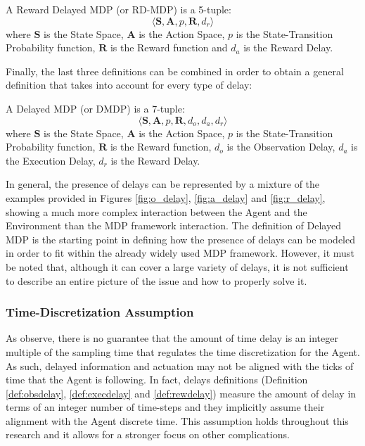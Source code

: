             \begin{definition}
                \label{def:rdmdp}
                A Reward Delayed MDP (or RD-MDP) is a 5-tuple:
                \[ \langle \mathbf{S}, \mathbf{A}, p, \mathbf{R}, d_r \rangle\]
                where $\mathbf{S}$ is the State Space, $\mathbf{A}$ is the Action Space, $p$ is the State-Transition Probability function, $\mathbf{R}$ is the Reward function and $d_a$ is the Reward Delay.
            \end{definition}
            \noindent
            Finally, the last three definitions can be combined in order to obtain a general definition that takes into account for every type of delay:
            
            \begin{definition}
                \label{def:dmdp}
                A Delayed MDP (or DMDP) is a 7-tuple:
                \[ \langle \mathbf{S}, \mathbf{A}, p, \mathbf{R}, d_o, d_a, d_r \rangle\]
                where $\mathbf{S}$ is the State Space, $\mathbf{A}$ is the Action Space, $p$ is the State-Transition Probability function, $\mathbf{R}$ is the Reward function, $d_o$ is the Observation Delay, $d_a$ is the Execution Delay, $d_r$ is the Reward Delay.
            \end{definition}
            \noindent
            In general, the presence of delays can be represented by a mixture of the examples provided in Figures \ref{fig:o_delay}, \ref{fig:a_delay} and \ref{fig:r_delay}, showing a much more complex interaction between the Agent and the Environment than the MDP framework interaction. \newline
            The definition of Delayed MDP is the starting point in defining how the presence of delays can be modeled in order to fit within the already widely used MDP framework. However, it must be noted that, although it can cover a large variety of delays, it is not sufficient to describe an entire picture of the issue and how to properly solve it.
            
            \subsubsection{Time-Discretization Assumption}
                As  observe, there is no guarantee that the amount of time delay is an integer multiple of the sampling time that regulates the time discretization for the Agent. As such, delayed information and actuation may not be aligned with the ticks of time that the Agent is following. In fact, delays definitions (Definition \ref{def:obsdelay}, \ref{def:execdelay} and \ref{def:rewdelay}) measure the amount of delay in terms of an integer number of time-steps and they implicitly assume their alignment with the Agent discrete time. This assumption holds throughout this research and it allows for a stronger focus on other complications.
        
